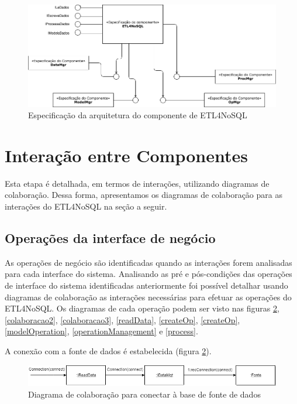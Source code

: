 \begin{figure}[h]
	\centering
	\includegraphics[scale=0.5]{fig/arquitetura_comp.png}
	\caption{Especificação da arquitetura do componente de ETL4NoSQL}
	\label{arquitetura}
\end{figure}

\section{Interação entre Componentes}

Esta etapa é detalhada, em termos de interações, utilizando diagramas de colaboração. Dessa forma, apresentamos os diagramas de colaboração para as interações do ETL4NoSQL na seção a seguir.

\subsection{Operações da interface de negócio}

As operações de negócio são identificadas quando as interações forem analisadas para cada interface do sistema. Analisando as pré e pós-condições das operações de interface do sistema identificadas anteriormente foi possível detalhar usando diagramas de colaboração as interações necessárias para efetuar as operações do ETL4NoSQL. Os diagramas de cada operação podem ser visto nas figuras \ref{colaboracao1}, \ref{colaboracao2}, \ref{colaboracao3}, \ref{readData}, \ref{createOp}, \ref{createOp}, \ref{modelOperation}, \ref{operationManagement} e \ref{process}.

A conexão com a fonte de dados é estabelecida (figura \ref{colaboracao1}).

\begin{figure}[h!]
	\centering
	\includegraphics[scale=0.5]{fig/colaboracao1.png}
	\caption{Diagrama de colaboração para conectar à base de fonte de dados}
	\label{colaboracao1}
\end{figure}

